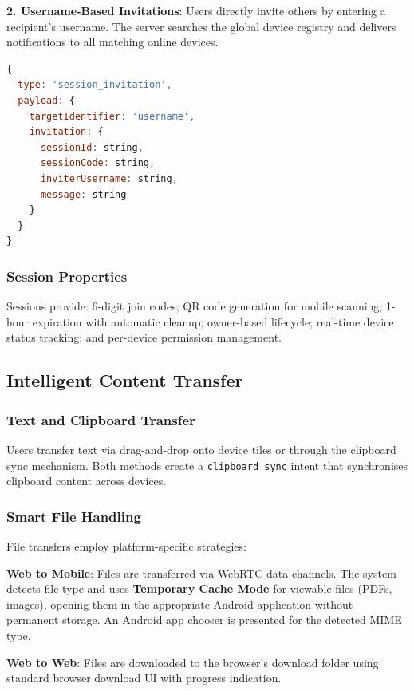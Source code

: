 \documentclass[conference]{IEEEtran}
\begin{document}
\textbf{2. Username-Based Invitations}: Users directly invite others by entering a recipient's username. The server searches the global device registry and delivers notifications to all matching online devices.

\begin{lstlisting}[language=JavaScript]
{
  type: 'session_invitation',
  payload: {
    targetIdentifier: 'username',
    invitation: {
      sessionId: string,
      sessionCode: string,
      inviterUsername: string,
      message: string
    }
  }
}
\end{lstlisting}

\subsubsection{Session Properties}

Sessions provide: 6-digit join codes; QR code generation for mobile scanning; 1-hour expiration with automatic cleanup; owner-based lifecycle; real-time device status tracking; and per-device permission management.

\subsection{Intelligent Content Transfer}

\subsubsection{Text and Clipboard Transfer}

Users transfer text via drag-and-drop onto device tiles or through the clipboard sync mechanism. Both methods create a \texttt{clipboard\_sync} intent that synchronises clipboard content across devices.

\subsubsection{Smart File Handling}

File transfers employ platform-specific strategies:

\textbf{Web to Mobile}: Files are transferred via WebRTC data channels. The system detects file type and uses \textbf{Temporary Cache Mode} for viewable files (PDFs, images), opening them in the appropriate Android application without permanent storage. An Android app chooser is presented for the detected MIME type.

\textbf{Web to Web}: Files are downloaded to the browser's download folder using standard browser download UI with progress indication.
\end{document}
